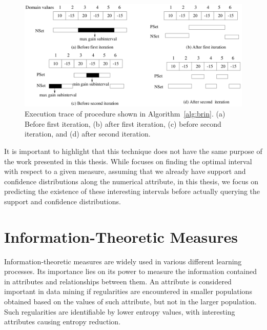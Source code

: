 \begin{figure}
\begin{center}
  \includegraphics[width=1\linewidth]{./Figures/optgain1d.png}
\end{center}
\caption{Execution trace of procedure shown in Algorithm~\ref{alg:brin}. (a) Before first iteration, (b) after first
iteration, (c) before second iteration, and (d) after second iteration\citep{Brin99miningoptimized}.}
\label{fig:optgain}
\end{figure}

It is important to highlight that this technique does not have the same purpose of the work presented in this thesis.
While \citet{Brin99miningoptimized} focuses on finding the optimal interval with respect to a given measure, assuming
that we already have support and confidence distributions along the numerical attribute, in this thesis, we focus on
predicting the existence of these interesting intervals before actually querying the support and confidence
distributions.

\section{Information-Theoretic Measures}
\label{sec:rw-infotheoreticmeasures}

Information-theoretic measures are widely used in various different learning processes. Its importance lies on its
power to measure the information contained in attributes and relationships between them. An attribute is
considered important in data mining if regularities are encountered in smaller populations obtained based on the values
of such attribute, but not in the larger population. Such regularities are identifiable by lower entropy values, with
interesting attributes causing entropy reduction. 


